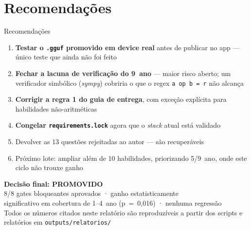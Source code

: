 \documentclass[aspectratio=169,11pt]{beamer}
\begin{document}
\section{Recomendações}

\begin{frame}{Recomendações}
  \begin{enumerate}
    \item \textbf{Testar o \texttt{.gguf} promovido em device real} antes de
      publicar no app — único teste que ainda não foi feito
    \item \textbf{Fechar a lacuna de verificação do 9\textordmasculine\ ano} — maior risco
      aberto; um verificador simbólico (\emph{sympy}) cobriria o que o regex
      \texttt{a op b = r} não alcança
    \item \textbf{Corrigir a regra 1 do guia de entrega}, com exceção
      explícita para habilidades não-aritméticas
    \item \textbf{Congelar \texttt{requirements.lock}} agora que o \emph{stack}
      atual está validado
    \item Devolver as 13 questões rejeitadas ao autor — são recuperáveis
    \item Próximo lote: ampliar além de 10 habilidades, priorizando
      5\textordmasculine/9\textordmasculine\ ano, onde este ciclo não trouxe ganho
  \end{enumerate}
\end{frame}

\begin{frame}
  \centering
  \Large\textbf{Decisão final: PROMOVIDO}\\[0.3cm]
  \normalsize 8/8 gates bloqueantes aprovados · ganho estatisticamente\\
  significativo em cobertura de 1\textordmasculine–4\textordmasculine\ ano (p~=~0,016) · nenhuma regressão\\[0.6cm]
  \small\color{basegray} Todos os números citados neste relatório são
  reproduzíveis a partir dos scripts e relatórios em \texttt{outputs/relatorios/}
\end{frame}
\end{document}
